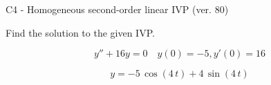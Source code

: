 \begin{exercise}
  \begin{exerciseTitle}C4 - Homogeneous second-order linear IVP (ver. 80)\end{exerciseTitle}
  \begin{exerciseStatement}
    
Find the solution to the given IVP.

    
\[y''+16y = 0 \hspace{1em} y(0) = -5 , y'(0) = 16\]

  \end{exerciseStatement}
  \begin{exerciseAnswer}
    
\[y= -5 \, \cos\left(4 \, t\right) + 4 \, \sin\left(4 \, t\right)\]

  \end{exerciseAnswer}
\end{exercise}